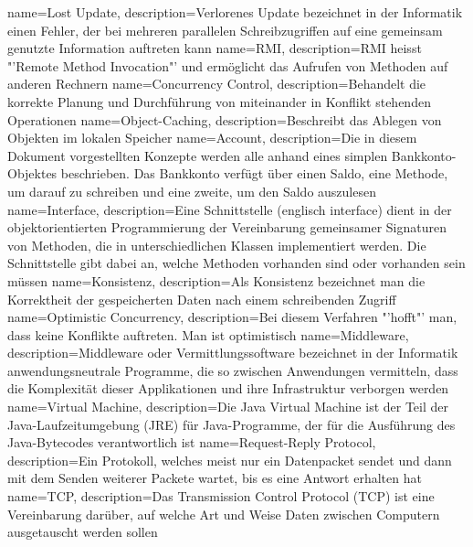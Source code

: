 {
  name=Lost Update,
  description={Verlorenes Update bezeichnet in der Informatik einen Fehler, der bei mehreren parallelen Schreibzugriffen auf eine gemeinsam genutzte Information auftreten kann}
}
{
  name=RMI,
  description={RMI heisst "'Remote Method Invocation"' und ermöglicht das Aufrufen von Methoden auf anderen Rechnern}
}
{
  name=Concurrency Control,
  description={Behandelt die korrekte Planung und Durchführung von miteinander in Konflikt stehenden Operationen}
}
{
  name=Object-Caching,
  description={Beschreibt das Ablegen von Objekten im lokalen Speicher}
}
{
  name=Account,
  description={Die in diesem Dokument vorgestellten Konzepte werden alle anhand eines simplen Bankkonto-Objektes beschrieben. Das Bankkonto verfügt über einen Saldo, eine Methode, um darauf zu schreiben und eine zweite, um den Saldo auszulesen}
}
{
  name=Interface,
  description={Eine Schnittstelle (englisch interface) dient in der objektorientierten Programmierung der Vereinbarung gemeinsamer Signaturen von Methoden, die in unterschiedlichen Klassen implementiert werden. Die Schnittstelle gibt dabei an, welche Methoden vorhanden sind oder vorhanden sein müssen}
}
{
  name=Konsistenz,
  description={Als Konsistenz bezeichnet man die Korrektheit der gespeicherten Daten nach einem schreibenden Zugriff}
}
{
  name=Optimistic Concurrency,
  description={Bei diesem Verfahren "'hofft"' man, dass keine Konflikte auftreten. Man ist optimistisch}
}
{
  name=Middleware,
  description={Middleware oder Vermittlungssoftware bezeichnet in der Informatik anwendungsneutrale Programme, die so zwischen Anwendungen vermitteln, dass die Komplexität dieser Applikationen und ihre Infrastruktur verborgen werden}
}
{
  name=Virtual Machine,
  description={Die Java Virtual Machine ist der Teil der Java\--\-Lauf\-zeit\-um\-geb\-ung (JRE) für Java-Programme, der für die Ausführung des Java-Bytecodes verantwortlich ist}
}
{
  name=Request-Reply Protocol,
  description={Ein Protokoll, welches meist nur ein Datenpacket sendet und dann mit dem Senden weiterer Packete wartet, bis es eine Antwort erhalten hat}
}
{
  name=TCP,
  description={Das Transmission Control Protocol (TCP) ist eine Vereinbarung darüber, auf welche Art und Weise Daten zwischen Computern ausgetauscht werden sollen}
}
